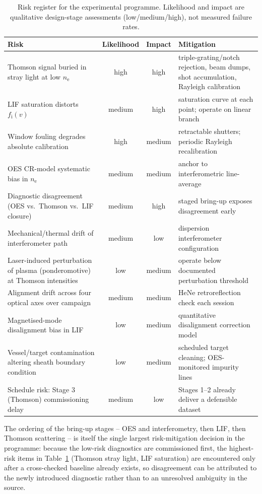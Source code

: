 \begin{table}[htbp]
\centering
\small
\begin{tabularx}{\textwidth}{@{}lccX@{}}
\toprule
Risk & Likelihood & Impact & Mitigation \\
\midrule
Thomson signal buried in stray light at low $n_{\mathrm{e}}$ & high & high & triple-grating/notch rejection, beam dumps, shot accumulation, Rayleigh calibration \cite{ref0360,ref0362} \\
LIF saturation distorts $f_{\mathrm{i}}(v)$ & medium & high & saturation curve at each point; operate on linear branch \cite{ref0292} \\
Window fouling degrades absolute calibration & high & medium & retractable shutters; periodic Rayleigh recalibration \\
OES CR-model systematic bias in $n_{\mathrm{e}}$ & medium & medium & anchor to interferometric line-average \cite{ref0231,ref0237} \\
Diagnostic disagreement (OES vs.\ Thomson vs.\ LIF closure) & medium & high & staged bring-up exposes disagreement early \\
Mechanical/thermal drift of interferometer path & medium & low & dispersion interferometer configuration \cite{ref0417} \\
Laser-induced perturbation of plasma (ponderomotive) at Thomson intensities & low & medium & operate below documented perturbation threshold \cite{ref0360} \\
Alignment drift across four optical axes over campaign & medium & medium & HeNe retroreflection check each session \\
Magnetised-mode disalignment bias in LIF & low & medium & quantitative disalignment correction model \\
Vessel/target contamination altering sheath boundary condition & low & medium & scheduled target cleaning; OES-monitored impurity lines \\
Schedule risk: Stage 3 (Thomson) commissioning delay & medium & low & Stages 1--2 already deliver a defensible dataset \\
\bottomrule
\end{tabularx}
\caption{Risk register for the experimental programme. Likelihood and impact are qualitative design-stage assessments (low/medium/high), not measured failure rates.}
\label{tab:risk-register}
\end{table}

The ordering of the bring-up stages -- OES and interferometry, then LIF, then Thomson scattering -- is itself the single largest risk-mitigation decision in the programme: because the low-risk diagnostics are commissioned first, the highest-risk items in Table~\ref{tab:risk-register} (Thomson stray light, LIF saturation) are encountered only after a cross-checked baseline already exists, so disagreement can be attributed to the newly introduced diagnostic rather than to an unresolved ambiguity in the source.

